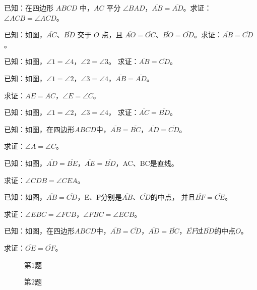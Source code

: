 \begin{Practice}
\begin{question}
  \item 已知：在四边形 $ABCD$ 中，$AC$ 平分 $\angle BAD$，$\overline{AB}=\overline{AD}$。求证：$\angle ACB=\angle ACD$。
  \item 已知：如图，$\overline{AC}$、$\overline{BD}$ 交于 $O$ 点，且 $\overline{AO}=\overline{OC}$、$\overline{BO}=\overline{OD}$。求证：$\overline{AB}=\overline{CD}$。


\item 已知：如图，$\angle 1=\angle 4$，$\angle 2=\angle 3$。
求证：$\overline{AB}=\overline{CD}$。
\item 已知：如图，$\angle 1=\angle 2$，$\angle 3=\angle 4$，$\overline{AB}=\overline{AD}$。

求证：$\overline{AE}=\overline{AC}$，$\angle E=\angle C$。

\item 已知：如图，$\angle 1=\angle 2$，$\angle 3=\angle 4$，
求证：$\overline{AC}=\overline{BD}$。
\item 已知：如图，在四边形$ABCD$中，$\overline{AB}=\overline{BC}$，$\overline{AD}=\overline{CD}$。

求证：$\angle A=\angle C$。
\item 已知：如图，$\overline{AD}=\overline{BE}$，$\overline{AE}=\overline{BD}$，AC、BC是直线。

求证：$\angle CDB=\angle CEA$。
\item 已知：如图，$\overline{AB}=\overline{CD}$，E、F分别是$\overline{AB}$、$\overline{CD}$的中点，
并且$\overline{BF}=\overline{CE}$。

求证：$\angle EBC=\angle FCB$，$\angle FBC=\angle ECB$。

\item 已知：如图，在四边形$ABCD$中，$\overline{AB}=\overline{CD}$，$\overline{AD}=\overline{BC}$，$\overline{EF}$过$\overline{BD}$的中点$O$。

求证：$\overline{OE}=\overline{OF}$。
\end{question}
\end{Practice}

\begin{figure}
    \begin{minipage}[t]{0.48\linewidth}
    \centering
{}
    \caption*{第1题}
    \end{minipage}
    \begin{minipage}[t]{0.48\linewidth}
    \centering
    \caption*{第2题}
    \end{minipage}
    \end{figure}

